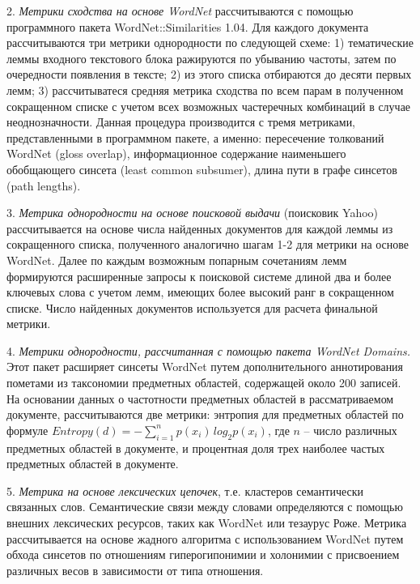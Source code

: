 2. \textit{Метрики сходства на основе WordNet} рассчитываются с помощью программного пакета WordNet::Similarities 1.04. Для каждого документа рассчитываются три метрики однородности по следующей схеме: 1) тематические леммы входного текстового блока ражируются по убыванию частоты, затем по очередности появления в тексте; 2) из этого списка отбираются до десяти первых лемм; 3) рассчитыватеся средняя метрика сходства по всем парам в полученном сокращенном списке с учетом всех возможных частеречных комбинаций в случае неоднозначности. Данная процедура производится с тремя метриками, представленными в программном пакете, а именно: пересечение толкований WordNet (gloss overlap), информационное содержание наименьшего обобщающего синсета (least common subsumer), длина пути в графе синсетов (path lengths). 

3. \textit{Метрика однородности на основе поисковой выдачи} (поисковик Yahoo) рассчитывается на основе числа найденных документов для каждой леммы из сокращенного списка, полученного аналогично шагам 1-2 для метрики на основе WordNet. Далее по каждым возможным попарным сочетаниям лемм формируются расширенные запросы к поисковой системе длиной два и более ключевых слова с учетом лемм, имеющих более высокий ранг в сокращенном списке. Число найденных документов используется для расчета финальной метрики.

4. \textit{Метрики однородности, рассчитанная с помощью пакета WordNet Domains.} Этот пакет расширяет синсеты WordNet путем дополнительного аннотирования пометами из таксономии предметных областей, содержащей около 200 записей. На основании данных о частотности предметных областей в рассматриваемом документе, рассчитываются две метрики: энтропия для предметных областей по формуле $Entropy(d) = -\sum_{i = 1}^{n}p(x_i)\,log_2 p(x_i)$, где $n$ -- число различных предметных областей в документе, и процентная доля трех наиболее частых предметных областей в документе.

5. \textit{Метрика на основе лексических цепочек}, т.е. кластеров семантически связанных слов. Семантические связи между словами определяются с помощью внешних лексических ресурсов, таких как WordNet или тезаурус Роже. Метрика рассчитывается на основе жадного алгоритма с использованием WordNet путем обхода синсетов по отношениям гиперогипонимии и холонимии с присвоением различных весов в зависимости от типа отношения.

